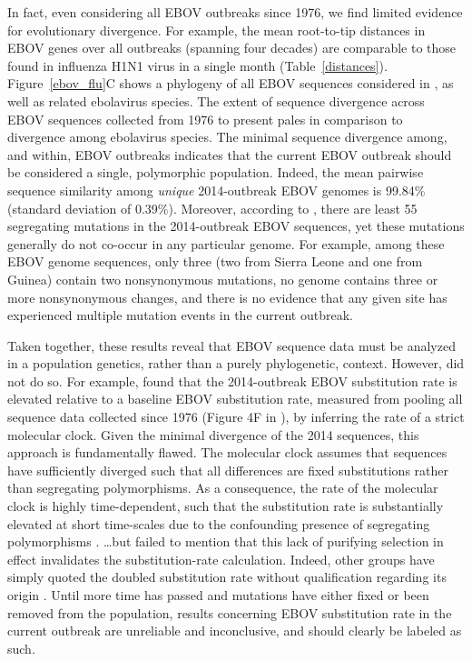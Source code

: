 \documentclass[11pt]{article}
\begin{document}
In fact, even considering all EBOV outbreaks since 1976, we find limited evidence for evolutionary divergence. For example, the mean root-to-tip distances in EBOV genes over all outbreaks (spanning four decades) are comparable to those found in influenza H1N1 virus in a single month (Table~\ref{distances}). Figure~\ref{ebov_flu}C shows a phylogeny of all EBOV sequences considered in \citet{Gire2014}, as well as related ebolavirus species. The extent of sequence divergence across EBOV sequences collected from 1976 to present pales in comparison to divergence among ebolavirus species. The minimal sequence divergence among, and within, EBOV outbreaks indicates that the current EBOV outbreak should be considered a single, polymorphic population. Indeed, the mean pairwise sequence similarity among \emph{unique} 2014-outbreak EBOV genomes is 99.84\% (standard deviation of 0.39\%). Moreover, according to \citet{Gire2014}, there are least 55 segregating mutations in the 2014-outbreak EBOV sequences, yet these mutations generally do not co-occur in any particular genome. For example, among these EBOV genome sequences, only three (two from Sierra Leone and one from Guinea) contain two nonsynonymous mutations, no genome contains three or more nonsynonymous changes, and there is no evidence that any given site has experienced multiple mutation events in the current outbreak.  

{\color{blue}Taken together, these results reveal that EBOV sequence data must be analyzed in a population genetics, rather than a purely phylogenetic, context. However, \citet{Gire2014} did not do so. For example, \citet{Gire2014} found that the 2014-outbreak EBOV substitution rate is elevated relative to a baseline EBOV substitution rate, measured from pooling all sequence data collected since 1976 (Figure 4F in \citealt{Gire2014}), by inferring the rate of a strict molecular clock. Given the minimal divergence of the 2014 sequences, this approach is fundamentally flawed. The molecular clock assumes that sequences have sufficiently diverged such that all differences are fixed substitutions rather than segregating polymorphisms. As a consequence, the rate of the molecular clock is highly time-dependent, such that the substitution rate is substantially elevated at short time-scales due to the confounding presence of segregating polymorphisms \citep{Hoetal2005, Hoetal2007, PetersonMasel2009, Hoetal2011}. \dots but failed to mention that this lack of purifying selection in effect invalidates the substitution-rate calculation. Indeed, other groups have simply quoted the doubled substitution rate without qualification regarding its origin \citep{Alexanderetal2014}. 
Until more time has passed and mutations have either fixed or been removed from the population, results concerning EBOV substitution rate in the current outbreak are unreliable and inconclusive, and should clearly be labeled as such.
}
\end{document}
